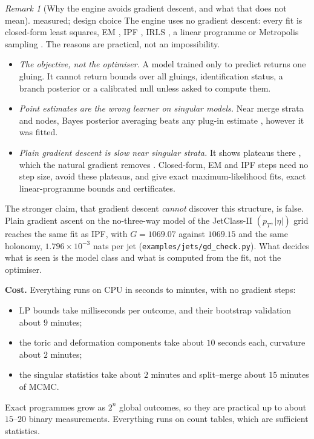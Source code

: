 \documentclass[11pt]{article}
\theoremstyle{definition}
\theoremstyle{remark}
\newtheorem{remark}[theorem]{Remark}
\newcommand{\st}[1]{\textsf{\small\color{gray}#1}}
\begin{document}
\begin{remark}[Why the engine avoids gradient descent, and what that does not mean]\label{rem:nogd}
\st{measured; design choice}
The engine uses no gradient descent: every fit is closed-form least squares, EM \cite{dlr}, IPF \cite{csiszar}, IRLS \cite{mccullaghnelder89}, a linear programme or Metropolis sampling \cite{metropolis53,hastings70}. The reasons are practical, not an impossibility.
\begin{itemize}
  \item \emph{The objective, not the optimiser.} A model trained only to predict returns one gluing. It cannot return bounds over all gluings, identification status, a branch posterior or a calibrated null unless asked to compute them.
  \item \emph{Point estimates are the wrong learner on singular models.} Near merge strata and nodes, Bayes posterior averaging beats any plug-in estimate \cite{watanabe}, however it was fitted.
  \item \emph{Plain gradient descent is slow near singular strata.} It shows plateaus there \cite{amariparkozeki06}, which the natural gradient removes \cite{amari98}. Closed-form, EM and IPF steps need no step size, avoid these plateaus, and give exact maximum-likelihood fits, exact linear-programme bounds and certificates.
\end{itemize}
The stronger claim, that gradient descent \emph{cannot} discover this structure, is false. Plain gradient ascent on the no-three-way model of the JetClass-II $(p_T,|\eta|)$ grid reaches the same fit as IPF, with $G=1069.07$ against $1069.15$ and the same holonomy, $1.796\times10^{-3}$ nats per jet (\texttt{examples/jets/gd\_check.py}). What decides what is seen is the model class and what is computed from the fit, not the optimiser.
\end{remark}

\textbf{Cost.} Everything runs on CPU in seconds to minutes, with no gradient steps:
\begin{itemize}
  \item LP bounds take milliseconds per outcome, and their bootstrap validation about $9$ minutes;
  \item the toric and deformation components take about $10$ seconds each, curvature about $2$ minutes;
  \item the singular statistics take about $2$ minutes and split--merge about $15$ minutes of MCMC.
\end{itemize}
Exact programmes grow as $2^n$ global outcomes, so they are practical up to about $15$--$20$ binary measurements. Everything runs on count tables, which are sufficient statistics.
\end{document}
